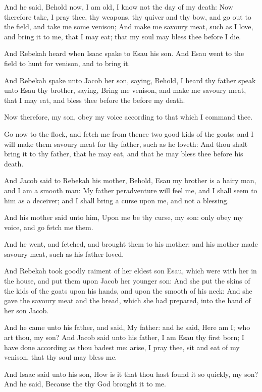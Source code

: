 \Verse And he said, Behold now, I am old, I know not the day of my death: \Verse Now therefore take, I pray thee, thy weapons, thy quiver and thy bow, and go out to the field, and take me some venison; \Verse And make me savoury meat, such as I love, and bring it to me, that I may eat; that my soul may bless thee before I die.

\Verse And Rebekah heard when Isaac spake to Esau his son. And Esau went to the field to hunt for venison, and to bring it.

\Verse And Rebekah spake unto Jacob her son, saying, Behold, I heard thy father speak unto Esau thy brother, saying, \Verse Bring me venison, and make me savoury meat, that I may eat, and bless thee before the \LORD before my death.

\Verse Now therefore, my son, obey my voice according to that which I command thee.

\Verse Go now to the flock, and fetch me from thence two good kids of the goats; and I will make them savoury meat for thy father, such as he loveth: \Verse And thou shalt bring it to thy father, that he may eat, and that he may bless thee before his death.

\Verse And Jacob said to Rebekah his mother, Behold, Esau my brother is a hairy man, and I am a smooth man: \Verse My father peradventure will feel me, and I shall seem to him as a deceiver; and I shall bring a curse upon me, and not a blessing.

\Verse And his mother said unto him, Upon me be thy curse, my son: only obey my voice, and go fetch me them.

\Verse And he went, and fetched, and brought them to his mother: and his mother made savoury meat, such as his father loved.

\Verse And Rebekah took goodly raiment of her eldest son Esau, which were with her in the house, and put them upon Jacob her younger son: \Verse And she put the skins of the kids of the goats upon his hands, and upon the smooth of his neck: \Verse And she gave the savoury meat and the bread, which she had prepared, into the hand of her son Jacob.

\Verse And he came unto his father, and said, My father: and he said, Here am I; who art thou, my son?  \Verse And Jacob said unto his father, I am Esau thy first born; I have done according as thou badest me: arise, I pray thee, sit and eat of my venison, that thy soul may bless me.

\Verse And Isaac said unto his son, How is it that thou hast found it so quickly, my son? And he said, Because the \LORD thy God brought it to me.


